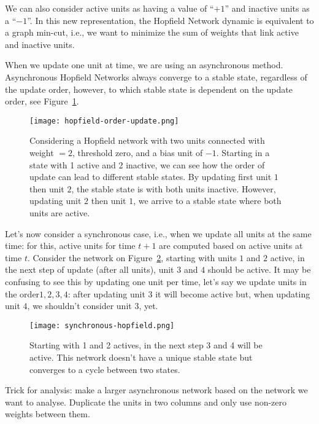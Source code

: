 \documentclass[main]{subfiles}
\begin{document}
We can also consider active units as having a value of ``$+1$'' and inactive units as a ``$-1$''.
In this new representation, the Hopfield Network dynamic is equivalent to a graph min-cut, i.e., we want to minimize the sum of weights that link active and inactive units.

When we update one unit at time, we are using an asynchronous method.
Asynchronous Hopfield Networks always converge to a stable state, regardless of the update order, however, to which stable state is dependent on the update order, see Figure~\ref{fig:hopfield-order-update}.

\begin{figure}[H]
	\centering
	\texttt{[image: hopfield-order-update.png]}
	\caption{Considering a Hopfield network with two units connected with weight $= 2$, threshold zero, and a bias unit of $-1$. Starting in a state with 1 active and 2 inactive, we can see how the order of update can lead to different stable states. By updating first unit $1$ then unit $2$, the stable state is with both units inactive. However, updating unit $2$ then unit $1$, we arrive to a stable state where both units are active.}
	\label{fig:hopfield-order-update}
\end{figure}

Let's now consider a synchronous case, i.e., when we update all units at the same time: for this, active units for time $t+1$ are computed based on active units at time $t$.
Consider the network on Figure~\ref{fig:synchronous-hopfield}, starting with units $1$ and $2$ active, in the next step of update (after all units), unit $3$ and $4$ should be active. It may be confusing to see this by updating one unit per time, let's say we update units in the order${1, 2, 3, 4}$: after updating unit $3$ it will become active but, when updating unit $4$, we shouldn't consider unit $3$, yet.

\begin{figure}[H]
	\centering
	\texttt{[image: synchronous-hopfield.png]}
	\caption{Starting with 1 and 2 actives, in the next step 3 and 4 will be active. This network doesn't have a unique stable state but converges to a cycle between two states.}
	\label{fig:synchronous-hopfield}
\end{figure}

Trick for analysis: make a larger asynchronous network based on the network we want to analyse. Duplicate the units in two columns and only use non-zero weights between them.
\end{document}
